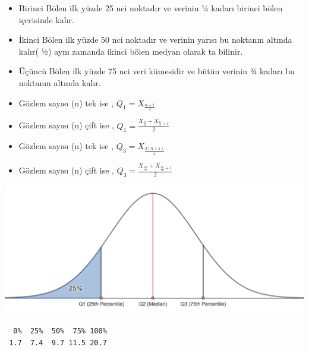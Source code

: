\documentclass[
  letterpaper,
  DIV=11,
  numbers=noendperiod]{scrreprt}
\newenvironment{Shaded}{\begin{snugshade}}{\end{snugshade}}
\newcommand{\AttributeTok}[1]{\textcolor[rgb]{0.40,0.45,0.13}{#1}}
\newcommand{\ConstantTok}[1]{\textcolor[rgb]{0.56,0.35,0.01}{#1}}
\newcommand{\FunctionTok}[1]{\textcolor[rgb]{0.28,0.35,0.67}{#1}}
\newcommand{\NormalTok}[1]{\textcolor[rgb]{0.00,0.23,0.31}{#1}}
\newcommand{\SpecialCharTok}[1]{\textcolor[rgb]{0.37,0.37,0.37}{#1}}
\begin{document}
\begin{itemize}
\item
  Birinci Bölen ilk yüzde 25 nci noktadır ve verinin ¼ kadarı birinci
  bölen içerisinde kalır.
\item
  İkinci Bölen ilk yüzde 50 nci noktadır ve verinin yarısı bu noktanın
  altında kalır( ½) aynı zamanda ikinci bölen medyan olarak ta bilinir.
\item
  Üçüncü Bölen ilk yüzde 75 nci veri kümesidir ve bütün verinin ¾ kadarı
  bu noktanın altında kalır.
\item
  Gözlem sayısı (n) tek ise , \(Q_1 = X_{\frac{n+1}{4}}\)
\item
  Gözlem sayısı (n) çift ise ,
  \(Q_1 = \frac{X_\frac{n}{4}+X_{\frac{n}{4}+1}}{2}\)
\item
  Gözlem sayısı (n) tek ise , \(Q_3 = X_{\frac{3(n+1)}{4}}\)
\item
  Gözlem sayısı (n) çift ise ,
  \(Q_3 = \frac{X_\frac{3n}{4}+X_{\frac{3n}{4}+1}}{2}\)
\end{itemize}

\begin{center}
\includegraphics{images/quartile.png}
\end{center}

\begin{Shaded}
\end{Shaded}

\begin{verbatim}
  0%  25%  50%  75% 100% 
 1.7  7.4  9.7 11.5 20.7 
\end{verbatim}

\begin{Shaded}
\end{Shaded}
\end{document}
